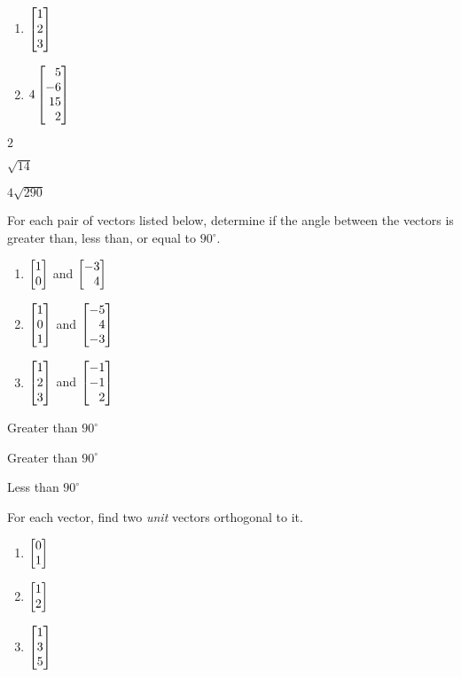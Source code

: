 \begin{exercises}
\begin{problist}
\begin{enumerate}
			\item $\mat{1\\2\\3}$
			\item $4\mat{5\\-6\\15\\2}$
		\end{enumerate}
		\begin{solution}
			\begin{enumerate*}
				\item $2$
				\item $\sqrt{14}$ 
				\item $4\sqrt{290}$ 
			\end{enumerate*}
		\end{solution}
		\prob For each pair of vectors listed below, determine if the angle between the vectors is greater than,
		less than, or equal to $90^\circ$.
		\begin{enumerate}
			\item $\mat{1\\0}$ and $\mat{-3\\4}$
			\item $\mat{1\\0\\1}$ and $\mat{-5\\4\\-3}$
			\item $\mat{1\\2\\3}$ and $\mat{-1\\-1\\2}$
		\end{enumerate}
		\begin{solution}
			\begin{enumerate*}
				\item Greater than $90^\circ$
				\item Greater than $90^\circ$
				\item Less than $90^\circ$
			\end{enumerate*}
		\end{solution}
		\prob For each vector, find two \emph{unit} vectors orthogonal to it.
		\begin{enumerate}
			\item $\mat{0\\1}$
			\item $\mat{1\\2}$
			\item $\mat{1\\3\\5}$

\end{enumerate}
\end{problist}
\end{exercises}
